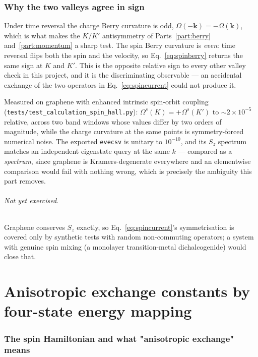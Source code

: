 \documentclass[11pt]{article}
\begin{document}
\section{Why the two valleys agree in sign}

Under time reversal the charge Berry curvature is odd, $\Omega(-\mathbf k)=
-\Omega(\mathbf k)$, which is what makes the $K/K'$ antisymmetry of
Parts~\ref{part:berry} and~\ref{part:momentum} a sharp test. The spin Berry
curvature is \emph{even}: time reversal flips both the spin and the velocity, so
Eq.~\eqref{eq:spinberry} returns the same sign at $K$ and $K'$. This is the
opposite relative sign to every other valley check in this project, and it is
the discriminating observable --- an accidental exchange of the two operators in
Eq.~\eqref{eq:spincurrent} could not produce it.

Measured on graphene with enhanced intrinsic spin-orbit coupling
(\texttt{tests/test\_calculation\_spin\_hall.py}): $\Omega^{s}(K)=+\Omega^{s}(K')$
to $\sim2\times10^{-5}$ relative, across two band windows whose values differ by
two orders of magnitude, while the charge curvature at the same points is
symmetry-forced numerical noise. The exported \texttt{evecsv} is unitary to
$10^{-10}$, and its $S_z$ spectrum matches an independent eigenstate query at the
same $k$ --- compared as a \emph{spectrum}, since graphene is Kramers-degenerate
everywhere and an elementwise comparison would fail with nothing wrong, which is
precisely the ambiguity this part removes.

\paragraph{Not yet exercised.} Graphene conserves $S_z$ exactly, so
Eq.~\eqref{eq:spincurrent}'s symmetrisation is covered only by synthetic tests
with random non-commuting operators; a system with genuine spin mixing (a
monolayer transition-metal dichalcogenide) would close that.


\part{Anisotropic exchange constants by four-state energy mapping}
\label{part:exchange}

\section{The spin Hamiltonian and what "anisotropic exchange" means}
\end{document}
